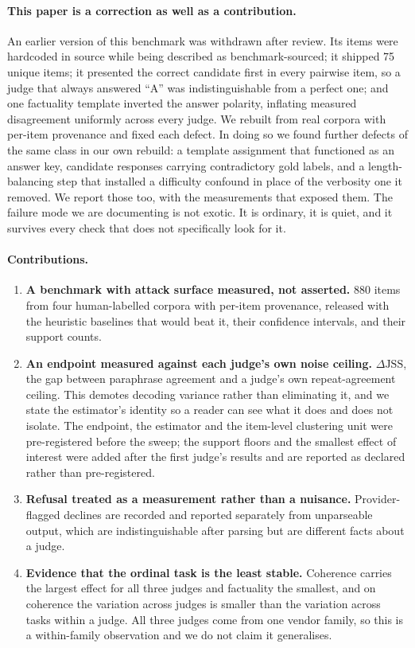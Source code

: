 \paragraph{This paper is a correction as well as a contribution.}
An earlier version of this benchmark \citep{bellibatlu2026judgesense} was
withdrawn after review. Its items were
hardcoded in source while being described as benchmark-sourced; it shipped 75
unique items; it presented the correct candidate first in every pairwise item, so
a judge that always answered ``A'' was indistinguishable from a perfect one; and
one factuality template inverted the answer polarity, inflating measured
disagreement uniformly across every judge. We rebuilt from real corpora with
per-item provenance and fixed each defect. In doing so we found further defects of the same class in our own rebuild: a
template assignment that functioned as an answer key, candidate responses
carrying contradictory gold labels, and a length-balancing step that installed a
difficulty confound in place of the verbosity one it removed. We report those
too, with the measurements that exposed them. The failure mode we are documenting is not exotic. It is
ordinary, it is quiet, and it survives every check that does not specifically
look for it.

\paragraph{Contributions.}
\begin{enumerate}
  \item \textbf{A benchmark with attack surface measured, not asserted.} 880
    items from four human-labelled corpora with per-item provenance, released
    with the heuristic baselines that would beat it, their confidence intervals,
    and their support counts.
  \item \textbf{An endpoint measured against each judge's own noise ceiling.}
    $\Delta\mathrm{JSS}$, the gap between paraphrase agreement and a judge's own
    repeat-agreement ceiling. This demotes decoding variance rather than
    eliminating it, and we state the estimator's identity so a reader can see
    what it does and does not isolate. The endpoint, the estimator and the
    item-level clustering unit were pre-registered before the sweep; the support
    floors and the smallest effect of interest were added after the first
    judge's results and are reported as declared rather than pre-registered.
  \item \textbf{Refusal treated as a measurement rather than a nuisance.}
    Provider-flagged declines are recorded and reported separately from
    unparseable output, which are indistinguishable after parsing but are
    different facts about a judge.
  \item \textbf{Evidence that the ordinal task is the least stable.} Coherence
    carries the largest effect for all three judges and factuality the smallest,
    and on coherence the variation across judges is smaller than the variation
    across tasks within a judge. All three judges come from one vendor family, so
    this is a within-family observation and we do not claim it generalises.
\end{enumerate}
